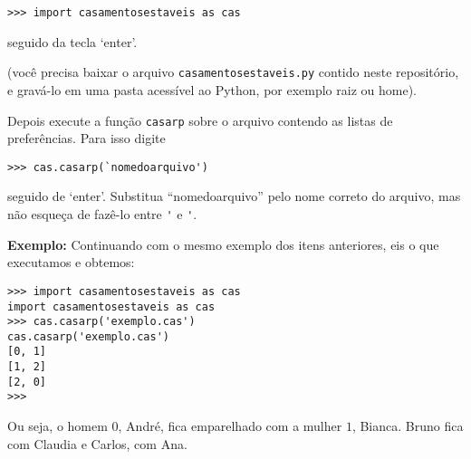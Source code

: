 \documentclass[11pt]{article}
\begin{document}
\verb|>>> import casamentosestaveis as cas|

seguido da tecla `enter'.

(você precisa baixar o arquivo \verb|casamentosestaveis.py| contido neste
repositório, e gravá-lo em uma pasta acessível ao Python, por exemplo raiz ou home).

Depois execute a função \verb|casarp| sobre o arquivo contendo as listas de 
preferências. Para isso digite

\verb|>>> cas.casarp(`nomedoarquivo')|

seguido de `enter'. Substitua ``nomedoarquivo'' pelo nome correto do arquivo, mas 
não esqueça de fazê-lo entre \verb|'| e \verb|'|.

{\bf Exemplo:} Continuando com o mesmo exemplo dos itens anteriores, eis o que
executamos e obtemos:

\begin{verbatim}
>>> import casamentosestaveis as cas
import casamentosestaveis as cas
>>> cas.casarp('exemplo.cas')
cas.casarp('exemplo.cas')
[0, 1]
[1, 2]
[2, 0]
>>> 
\end{verbatim}

Ou seja, o homem $0$, André, fica emparelhado com a mulher $1$, Bianca. Bruno fica
com Claudia e Carlos, com Ana.
\end{document}
